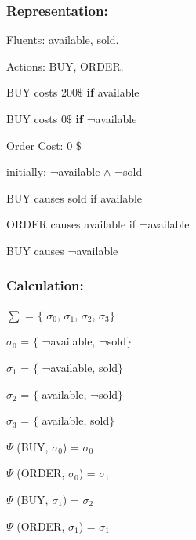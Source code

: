 \documentclass[11pt]{article}
\begin{document}
	\subsubsection{Representation:}\label{par:p202}
	\indent 
	\par Fluents: available, sold.\par
	Actions: BUY, ORDER.\par
	BUY costs 200$\$$  \textbf{if} available\par
	
	BUY costs 0$\$$  \textbf{if} ¬available\par
	
	
	Order Cost: 0 $\$$
	
	initially: ¬available $\wedge$  ¬sold\par
	
	BUY causes sold if available\par
	
	ORDER causes available if ¬available\par
	
	BUY causes ¬available\\
	
	\subsubsection{Calculation:}\label{par:p302}
	\indent \par
	$ \sum $ = $ \{ $ $ \sigma _{0}$, $ \sigma _{1}$, $ \sigma _{2}$, $ \sigma _{3}$$ \} $ \par
	
	$ \sigma _{0}$ = $ \{ $ ¬available, ¬sold$ \} $ \par
	
	$ \sigma _{1}$ = $ \{ $ ¬available, sold$ \} $ \par
	
	$ \sigma _{2}$ = $ \{ $ available, ¬sold$ \} $ \par
	
	$ \sigma _{3}$ = $ \{ $ available, sold$ \} $ \par
	\(  \Psi  \)  (BUY, $ \sigma _{0}$) = $ \sigma _{0}$\par
	
	\(  \Psi  \)  (ORDER, $ \sigma _{0}$) = $ \sigma _{1}$\par
	
	\(  \Psi  \)  (BUY, $ \sigma _{1}$) = $ \sigma _{2}$\par
	
	\(  \Psi  \)  (ORDER, $ \sigma _{1}$) = $ \sigma _{1}$\par
	
\end{document}
